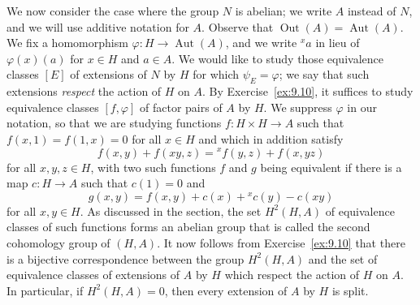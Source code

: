 \documentclass[../Odyssey_Project.tex]{subfiles}
\begin{document}
We now consider the case where the group $N$ is abelian; we write $A$ instead of $N$, and we will use additive notation for $A$. Observe that $\operatorname{Out}(A) = \operatorname{Aut}(A)$. We fix a homomorphism $\varphi: H \to \operatorname{Aut}(A)$, and we write ${}^x a$ in lieu of $\varphi(x)(a)$ for $x \in H$ and $a \in A$. We would like to study those equivalence classes $[E]$ of extensions of $N$ by $H$ for which $\psi_E = \varphi$; we say that such extensions \emph{respect} the action of $H$ on $A$. By Exercise~\ref{ex:9.10}, it suffices to study equivalence classes $[f, \varphi]$ of factor pairs of $A$ by $H$. We suppress $\varphi$ in our notation, so that we are studying functions $f: H \times H \to A$ such that $f(x, 1) = f(1, x) = 0$ for all $x \in H$ and which in addition satisfy
\[
f(x, y) + f(xy, z) = {}^x f(y, z) + f(x, yz)
\]
for all $x, y, z \in H$, with two such functions $f$ and $g$ being equivalent if there is a map $c: H \to A$ such that $c(1) = 0$ and
\[
g(x, y) = f(x, y) + c(x) + {}^x c(y) - c(xy)
\]
for all $x, y \in H$. As discussed in the section, the set $H^2(H, A)$ of equivalence classes of such functions forms an abelian group that is called the second cohomology group of $(H, A)$. It now follows from Exercise~\ref{ex:9.10} that there is a bijective correspondence between the group $H^2(H, A)$ and the set of equivalence classes of extensions of $A$ by $H$ which respect the action of $H$ on $A$. In particular, if $H^2(H, A) = 0$, then every extension of $A$ by $H$ is split.
\end{document}
